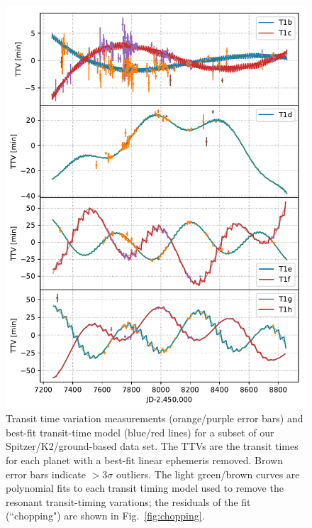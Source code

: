 \documentclass[twocolumn]{aastex63}
\begin{document}
\begin{figure}
	\includegraphics[width=0.95\hsize]{figures/T1_ttvs_4panel_stacked.pdf}
    \caption{Transit time variation measurements (orange/purple error bars) and best-fit
    transit-time model (blue/red lines) for a subset of our
    Spitzer/K2/ground-based data set.  The TTVs are the transit times for each planet 
    with a best-fit linear ephemeris removed.  Brown error bars indicate $>3\sigma$ outliers.  The light green/brown curves are polynomial fits
    to each transit timing model used to remove the resonant transit-timing varations;  the residuals
    of the fit (``chopping") are shown in Fig.\ \ref{fig:chopping}.}
    \label{fig:T1_TTVs}
\end{figure}
\end{document}
